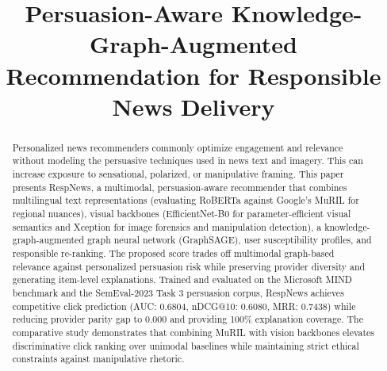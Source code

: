 \documentclass[conference]{IEEEtran}
\begin{document}
\title{Persuasion-Aware Knowledge-Graph-Augmented Recommendation for Responsible News Delivery}

\author{
\and
{}
\and
{}
}

\maketitle

\begin{abstract}
Personalized news recommenders commonly optimize engagement and relevance without modeling the persuasive techniques used in news text and imagery. This can increase exposure to sensational, polarized, or manipulative framing. This paper presents RespNews, a multimodal, persuasion-aware recommender that combines multilingual text representations (evaluating RoBERTa against Google's MuRIL for regional nuances), visual backbones (EfficientNet-B0 for parameter-efficient visual semantics and Xception for image forensics and manipulation detection), a knowledge-graph-augmented graph neural network (GraphSAGE), user susceptibility profiles, and responsible re-ranking. The proposed score trades off multimodal graph-based relevance against personalized persuasion risk while preserving provider diversity and generating item-level explanations. Trained and evaluated on the Microsoft MIND benchmark and the SemEval-2023 Task 3 persuasion corpus, RespNews achieves competitive click prediction (AUC: 0.6804, nDCG@10: 0.6080, MRR: 0.7438) while reducing provider parity gap to 0.000 and providing 100\% explanation coverage. The comparative study demonstrates that combining MuRIL with vision backbones elevates discriminative click ranking over unimodal baselines while maintaining strict ethical constraints against manipulative rhetoric.
\end{abstract}
\end{document}

